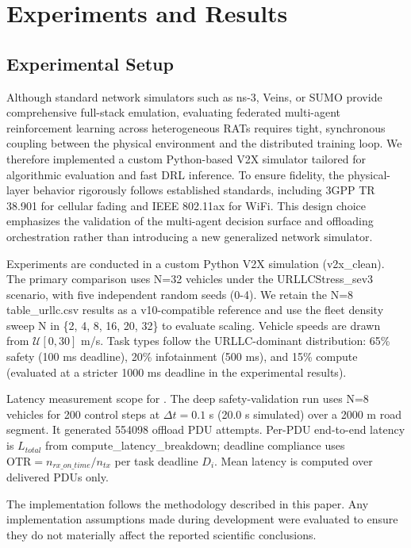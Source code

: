 \section{Experiments and Results}

\subsection{Experimental Setup}
Although standard network simulators such as ns-3, Veins, or SUMO provide comprehensive full-stack emulation, evaluating federated multi-agent reinforcement learning across heterogeneous RATs requires tight, synchronous coupling between the physical environment and the distributed training loop. We therefore implemented a custom Python-based V2X simulator tailored for algorithmic evaluation and fast DRL inference. To ensure fidelity, the physical-layer behavior rigorously follows established standards, including 3GPP TR 38.901 for cellular fading and IEEE 802.11ax for WiFi. This design choice emphasizes the validation of the multi-agent decision surface and offloading orchestration rather than introducing a new generalized network simulator.



Experiments are conducted in a custom Python V2X simulation (v2x\_clean). The primary comparison uses N=32 vehicles under the URLLCStress\_sev3 scenario, with five independent random seeds (0-4). We retain the N=8 table\_urllc.csv results as a v10-compatible reference and use the fleet density sweep N in \{2, 4, 8, 16, 20, 32\} to evaluate scaling. Vehicle speeds are drawn from $\mathcal{U}[0, 30]$ m/s. Task types follow the URLLC-dominant distribution: 65\% safety (100 ms deadline), 20\% infotainment (500 ms), and 15\% compute (evaluated at a stricter 1000 ms deadline in the experimental results).

Latency measurement scope for . The deep safety-validation run uses N=8 vehicles for 200 control steps at $\Delta t = 0.1$ s (20.0 s simulated) over a 2000 m road segment. It generated 554098 offload PDU attempts. Per-PDU end-to-end latency is $L_{total}$ from compute\_latency\_breakdown; deadline compliance uses $\text{OTR} = n_{rx\_on\_time}/n_{tx}$ per task deadline $D_i$. Mean latency is computed over delivered PDUs only.

The implementation follows the methodology described in this paper. Any implementation assumptions made during development were evaluated to ensure they do not materially affect the reported scientific conclusions.

